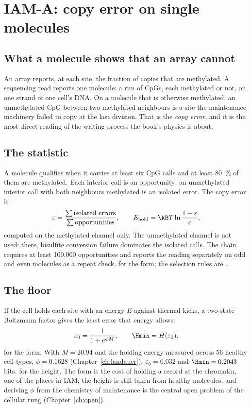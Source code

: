 \chapter{IAM-A: copy error on single molecules}\label{ch:iama}

\section{What a molecule shows that an array cannot}

An array reports, at each site, the fraction of copies that are methylated. A sequencing read reports one molecule: a run of
CpGs, each methylated or not, on one strand of one cell's DNA. On a molecule that is otherwise methylated, an unmethylated CpG
between two methylated neighbours is a site the maintenance machinery failed to copy at the last division. That is the
\emph{copy error}, and it is the most direct reading of the writing process the book's physics is about.

\section{The statistic}

A molecule qualifies when it carries at least six CpG calls and at least 80~\% of them are methylated. Each interior call is
an opportunity; an unmethylated interior call with both neighbours methylated is an isolated error. The copy error is
\begin{equation}
  \varepsilon=\frac{\sum\text{isolated errors}}{\sum\text{opportunities}},
  \qquad E_{\rm hold}=\kB T\ln\frac{1-\varepsilon}{\varepsilon},
  \label{eq:eps}
\end{equation}
computed on the methylated channel only. The unmethylated channel is not used: there, bisulfite conversion failure dominates
the isolated calls. The chain requires at least 100,000 opportunities and reports the reading separately on odd and even
molecules as a repeat check. \derived{} for the form; the selection rules are \calibrated.

\section{The floor}

If the cell holds each site with an energy $E$ against thermal kicks, a two-state Boltzmann factor gives the least error that
energy allows:
\begin{equation}
  \varepsilon_0=\frac{1}{1+e^{\phi M}},\qquad \Hmin=H(\varepsilon_0).
  \label{eq:eps0}
\end{equation}
\derived{} for the form. With $M=20.94$ and the holding energy measured across 56 healthy cell types, $\phi=0.1628$
(Chapter~\ref{ch:landauer}), $\varepsilon_0=0.032$ and $\Hmin=0.2043$ bits. \measured{} for the height. The form is the cost of holding a record at
the chromatin, one of the places in IAM; the height is still taken from healthy molecules, and deriving $\phi$ from the chemistry of
maintenance is the central open problem of the cellular rung (Chapter~\ref{ch:open}).

